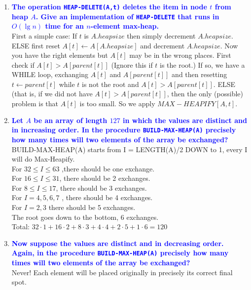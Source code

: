 \documentclass[11pt]{article}
\begin{document}
\begin{enumerate}
\item \textbf{\textcolor{blue}{The operation {\tt HEAP-DELETE(A,t)} deletes the item in node $t$
from heap $A$.  Give an implementation of {\tt HEAP-DELETE} that runs in
$O(\lg n)$ time for an $n$-element max-heap.}}
    \\ First a simple case: If $t$ is $A.heapsize$ then simply decrement
    $A.heapsize$.  ELSE first reset $A[t]\leftarrow A[A.heapsize]$ and
    decrement $A.heapsize$.  Now you have the right elements but $A[t]$
    may be in the wrong places.  First check if $A[t]> A[parent[t]]$
    (Ignore this if $t$ is the root.)  If so, we have a WHILE loop,
    exchanging $A[t]$ and $A[parent[t]]$ and then resetting $t\leftarrow parent[t]$
    while $t$ is not the root and $A[t]> A[parent[t]]$. ELSE (that is, if
    we did not have $A[t]> A[parent[t]]$, then the only (possible) problem
    is that $A[t]$ is too small.  So we apply $MAX-HEAPIFY[A,t]$.

\item \textbf{\textcolor{blue}{Let $A$ be an array of length $127$ in which the values are
distinct and in increasing order.  In the procedure 
{\tt BUILD-MAX-HEAP(A)} precisely how many times will two elements
of the array be exchanged?}}
    \\ BUILD-MAX-HEAP(A) starts from I = LENGTH(A)/2 DOWN to 1, every I will 
    do Max-Heapify. \\ For $32\leq I\leq 63$ ,there should be one exchange.
    \\ For $16\leq I \leq 31$, there should be 2 exchanges. 
    \\ For $8\leq  I \leq 17$, there should be 3 exchanges. 
    \\ For $I=4,5,6,7$ , there should be 4 exchanges. 
    \\ For $I = 2,3$ there should be 5 exchanges. 
    \\ The root goes down to the bottom, 6 exchanges. 
    \\ Total: $32\cdot 1+16\cdot 2+8\cdot 3+4\cdot 4+2\cdot 5+1\cdot 6 = 120$
\item \textbf{\textcolor{blue}{Now suppose the values are distinct and in decreasing order. Again, in the procedure 
{\tt BUILD-MAX-HEAP(A)} precisely how many times will two elements
of the array be exchanged?}}
    \\ Never!  Each element will be placed originally in precisely its
    correct final spot.
\end{enumerate}
    
\end{document}
